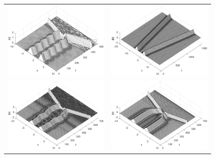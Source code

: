 \documentclass[12pt]{elsarticle}
\begin{document}
\begin{figure}[H]
\centering
\begin{tabular}{cc}
\includegraphics[width=8cm]{images/DP0ppstretchwaterfall} &
\includegraphics[width=8cm]{images/DP1ppstretchwaterfall} \\
\includegraphics[width=8cm]{images/DP0ppphasewaterfall} &
\includegraphics[width=8cm]{images/DP1ppphasewaterfall} \\

\end{tabular}
\end{figure}
\end{document}
